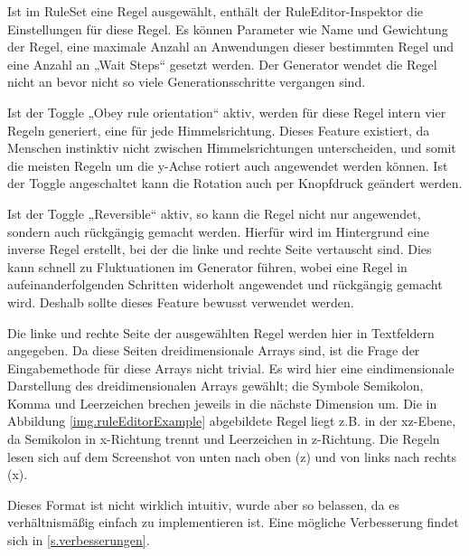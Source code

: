 
Ist im RuleSet eine Regel ausgewählt, enthält der RuleEditor-Inspektor die Einstellungen für diese Regel. Es können Parameter wie Name und Gewichtung der Regel, eine maximale Anzahl an Anwendungen dieser bestimmten Regel und eine Anzahl an „Wait Steps“ gesetzt werden. Der Generator wendet die Regel nicht an bevor nicht so viele Generationsschritte vergangen sind.

Ist der Toggle „Obey rule orientation“ aktiv, werden für diese Regel intern vier Regeln generiert, eine für jede Himmelsrichtung. Dieses Feature existiert, da Menschen instinktiv nicht zwischen Himmelsrichtungen unterscheiden, und somit die meisten Regeln um die y-Achse rotiert auch angewendet werden können. Ist der Toggle angeschaltet kann die Rotation auch per Knopfdruck geändert werden. 

Ist der Toggle „Reversible“ aktiv, so kann die Regel nicht nur angewendet, sondern auch rückgängig gemacht werden. Hierfür wird im Hintergrund eine inverse Regel erstellt, bei der die linke und rechte Seite vertauscht sind. Dies kann schnell zu Fluktuationen im Generator führen, wobei eine Regel in aufeinanderfolgenden Schritten widerholt angewendet und rückgängig gemacht wird. Deshalb sollte dieses Feature bewusst verwendet werden.

Die linke und rechte Seite der ausgewählten Regel werden hier in Textfeldern angegeben. Da diese Seiten dreidimensionale Arrays sind, ist die Frage der Eingabemethode für diese Arrays nicht trivial. Es wird hier eine eindimensionale Darstellung des dreidimensionalen Arrays gewählt; die Symbole Semikolon, Komma und Leerzeichen brechen jeweils in die nächste Dimension um. Die in Abbildung \ref{img.ruleEditorExample} abgebildete Regel liegt z.B. in der xz-Ebene, da Semikolon in x-Richtung trennt und Leerzeichen in z-Richtung. Die Regeln lesen sich auf dem Screenshot von unten nach oben (z) und von links nach rechts (x).


Dieses Format ist nicht wirklich intuitiv, wurde aber so belassen, da es verhältnismäßig einfach zu implementieren ist. Eine mögliche Verbesserung findet sich in \ref{s.verbesserungen}. 

